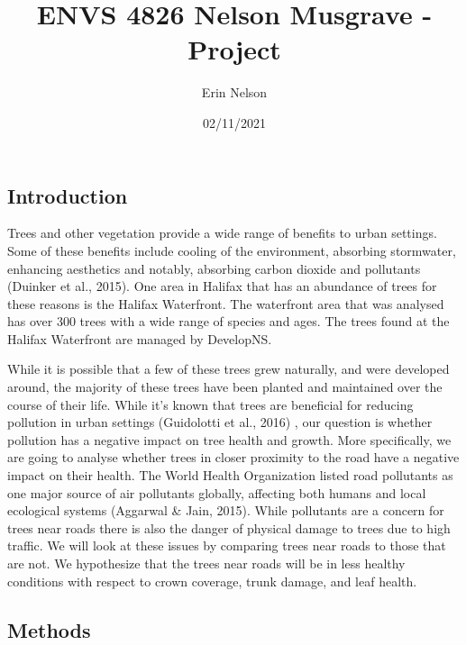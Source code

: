 \documentclass[
]{article}
\title{ENVS 4826 Nelson Musgrave - Project}
\author{Erin Nelson}
\date{02/11/2021}
\begin{document}
\maketitle

\hypertarget{introduction}{%
\subsection{Introduction}\label{introduction}}

Trees and other vegetation provide a wide range of benefits to urban
settings. Some of these benefits include cooling of the environment,
absorbing stormwater, enhancing aesthetics and notably, absorbing carbon
dioxide and pollutants (Duinker et al., 2015). One area in Halifax that
has an abundance of trees for these reasons is the Halifax Waterfront.
The waterfront area that was analysed has over 300 trees with a wide
range of species and ages. The trees found at the Halifax Waterfront are
managed by DevelopNS.

While it is possible that a few of these trees grew naturally, and were
developed around, the majority of these trees have been planted and
maintained over the course of their life. While it's known that trees
are beneficial for reducing pollution in urban settings (Guidolotti et
al., 2016) , our question is whether pollution has a negative impact on
tree health and growth. More specifically, we are going to analyse
whether trees in closer proximity to the road have a negative impact on
their health. The World Health Organization listed road pollutants as
one major source of air pollutants globally, affecting both humans and
local ecological systems (Aggarwal \& Jain, 2015). While pollutants are
a concern for trees near roads there is also the danger of physical
damage to trees due to high traffic. We will look at these issues by
comparing trees near roads to those that are not. We hypothesize that
the trees near roads will be in less healthy conditions with respect to
crown coverage, trunk damage, and leaf health.

\hypertarget{methods}{%
\subsection{Methods}\label{methods}}
\end{document}
